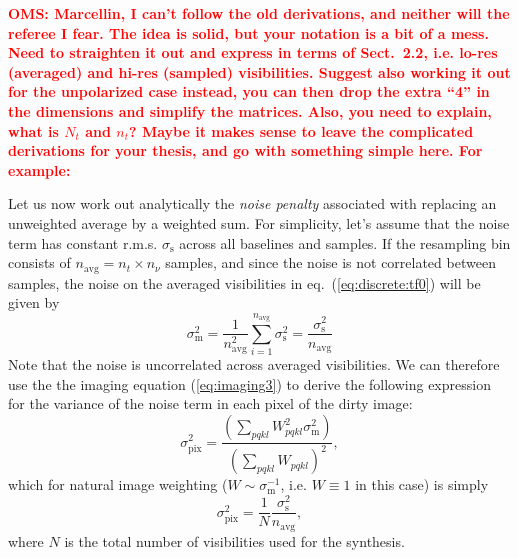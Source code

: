 \documentclass[useAMS,usenatbib]{mn2e}
\newcommand{\OMS}[1]{\textcolor{red}{{\bf OMS: #1}}}
\begin{document}
\OMS{Marcellin, I can't follow the old derivations, and neither will the referee I fear. 
The idea is solid, but your notation is a bit of a mess. Need to straighten it out
and express in terms of Sect.~2.2, i.e. lo-res (averaged) and hi-res (sampled) visibilities. 
Suggest also working it out for the unpolarized case instead, you can then drop the 
extra ``4'' in the dimensions and simplify the matrices. Also, you need to explain, what is $N_t$ and $n_t$? 
Maybe it makes sense to leave the complicated derivations for your thesis, and go with something simple here. 
For example:}

Let us now work out analytically the \emph{noise penalty} associated with replacing an unweighted average by 
a weighted sum. For simplicity, let's assume that the noise term
has constant r.m.s. $\sigma_\mathrm{s}$ across all baselines and samples. If the resampling bin 
consists of $n_\mathrm{avg} = n_t\times n_\nu$ samples, and since the noise is not correlated between samples, 
the noise on the averaged visibilities in eq.~(\ref{eq:discrete:tf0}) will be given by
\begin{equation}
\sigma_\mathrm{m}^2 = \frac{1}{n_\mathrm{avg}^2} \sum_{i=1}^{n_\mathrm{avg}} \sigma_\mathrm{s}^2  = \frac{\sigma_\mathrm{s}^2}{n_\mathrm{avg}}
\end{equation}
Note that the noise is uncorrelated across averaged visibilities. We can therefore use the
the imaging equation (\ref{eq:imaging3}) to derive the following expression for the variance of the noise 
term in each pixel of the dirty image:
\begin{equation}
\label{eq:noise:image}
\sigma_\mathrm{pix}^2 = \frac{ (\sum_{pqkl} W_{pqkl}^2 \sigma_\mathrm{m}^2) }{ (\sum_{pqkl} W_{pqkl})^2 },
\end{equation}
which for natural image weighting ($W\sim\sigma^{-1}_\mathrm{m}$, i.e. $W\equiv1$ in this case) is simply
\begin{equation}
\sigma_\mathrm{pix}^2 = \frac{1}{N}\frac{\sigma_\mathrm{s}^2}{n_\mathrm{avg}},
\end{equation}
where $N$ is the total number of visibilities used for the synthesis.
\end{document}
